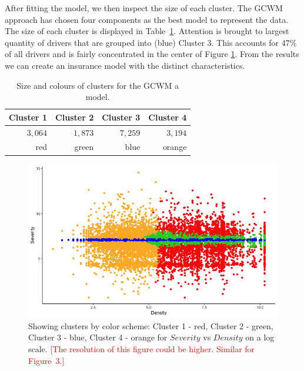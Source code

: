 \documentclass[11pt,letterpaper]{article}
\numberwithin{equation}{section}
\numberwithin{equation}{section}
\numberwithin{equation}{section}
\begin{document}
After fitting the model, we then inspect the size of each cluster. The GCWM approach has chosen four components as the best model to represent the data. The size of each cluster is displayed in Table~\ref{table:sizeSev}. Attention is brought to largest quantity of drivers that are grouped into (blue) Cluster 3. This accounts for $ 47 \% $ of all drivers and is fairly concentrated in the center of Figure \ref{fig:vet1a}. From the results we can create an insurance model with the distinct characteristics.
\begin{table}[!htb]
\centering
\caption{Size and colours of clusters for the GCWM a model.}
\label{table:sizeSev}
\begin{tabular}{rrrr}
\hline
Cluster 1   & Cluster 2  & Cluster 3   & Cluster 4    \\
\hline
$3,064$ & $1,873$  &$ 7,259$ & $3,194$ \\
red & green & blue & orange \\

\hline
\end{tabular}
\end{table}
\begin{figure}[!htb]
\begin{center}
\includegraphics[scale=0.50]{sevClusterPlot.png}
\end{center}
\vspace{-0.2in}
\caption{Showing clusters by color scheme: Cluster 1 - red, Cluster 2 - green, Cluster 3 - blue, Cluster 4 - orange for $Severity$ vs $Density$ on a log scale. \textcolor{red}{[The resolution of this figure could be higher. Similar for Figure~3.]}}
\label{fig:vet1a}
\end{figure}
\end{document}
